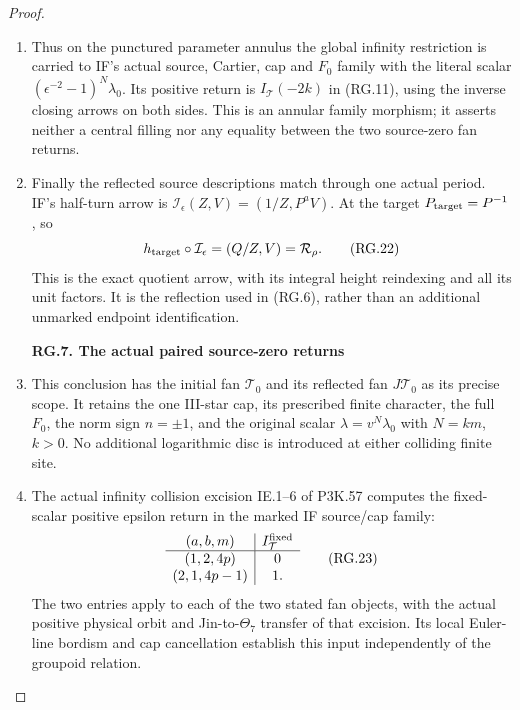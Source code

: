 \begin{proof}
\begin{enumerate}[label=\arabic*.]
\item Thus on the punctured parameter annulus the global
infinity restriction is carried to IF's actual source,
Cartier, cap and \(F_0\) family with the literal scalar
\((\epsilon^{-2}-1)^N\lambda_0\). Its positive return
is \(I_{\mathcal T}(-2k)\) in (RG.11), using the inverse
closing arrows on both sides. This is an annular family
morphism; it asserts neither a central filling nor
any equality between the two source-zero fan returns.

\item Finally the reflected source descriptions match through
one actual period. IF's half-turn arrow is
\(\mathcal I_\epsilon(Z,V)=(1/Z,P^aV)\).
At the target \(P_{\rm target}=P^{-1}\), so
\[
        h_{\rm target}\circ\mathcal I_\epsilon
                  =(Q/Z,V)=\mathcal R_\rho .
                                                        \tag{RG.22}
\]
This is the exact quotient arrow, with its integral
height reindexing and all its unit factors. It is the
reflection used in (RG.6), rather than an additional
unmarked endpoint identification.

\par

\medskip\noindent\textbf{RG.7. The actual paired source-zero returns}

\par\nobreak

\item This conclusion has the initial fan \(\mathcal T_0\) and
its reflected fan \(J\mathcal T_0\) as its precise scope.
It retains the one III-star cap, its prescribed finite
character, the full \(F_0\), the norm sign \(n=\pm1\),
and the original scalar
\(\lambda=v^N\lambda_0\) with \(N=km\), \(k>0\).
No additional logarithmic disc is introduced at either
colliding finite site.

\item The actual infinity collision excision IE.1--6 of
P3K.57 computes the fixed-scalar positive epsilon
return in the marked IF source/cap family:
\[
 \begin{array}{c|c}
 (a,b,m)&I^{\rm fixed}_{\mathcal T}\\ \hline
 (1,2,4p)&0\\
 (2,1,4p-1)&1 .
 \end{array}                                            \tag{RG.23}
\]
The two entries apply to each of the two stated fan
objects, with the actual positive physical orbit and
Jin-to-\(\Theta_7\) transfer of that excision. Its local
Euler-line bordism and cap cancellation establish this
input independently of the groupoid relation.


\end{enumerate}
\end{proof}
